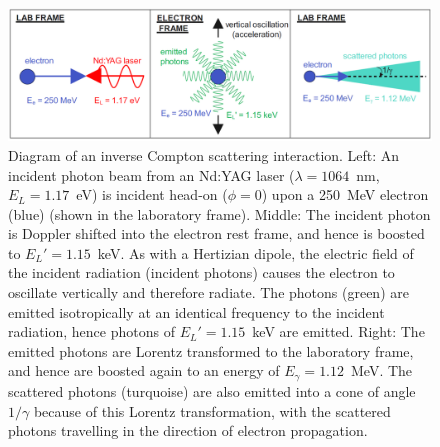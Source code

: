 \documentclass[../main.tex]{subfiles}
\begin{document}
\begin{figure}[!h]
\centering
\includegraphics[width=\textwidth]{Figures/Introduction/ICS_diagram_frames_fixed.pdf}
\caption{Diagram of an inverse Compton scattering interaction. Left: An incident photon beam from an Nd:YAG laser ($\lambda = 1064$~\si{\nano\meter}, $E_{L} = 1.17$~\si{\electronvolt}) is incident head-on ($\phi=0$) upon a 250~\si{\mega\electronvolt} electron (blue) (shown in the laboratory frame). Middle: The incident photon is Doppler shifted into the electron rest frame, and hence is boosted to $E_{L}' = 1.15$~\si{\kilo\electronvolt}. As with a Hertizian dipole, the electric field of the incident radiation (incident photons) causes the electron to oscillate vertically and therefore radiate. The photons (green) are emitted isotropically at an identical frequency to the incident radiation, hence photons of $E_{L}' = 1.15$~\si{\kilo\electronvolt} are emitted. Right: The emitted photons are Lorentz transformed to the laboratory frame, and hence are boosted again to an energy of $E_{\gamma} = 1.12$~\si{\mega\electronvolt}. The scattered photons (turquoise) are also emitted into a cone of angle $1/\gamma$ because of this Lorentz transformation, with the scattered photons travelling in the direction of electron propagation.}
\label{fig:ICS_frames_diagram}
\end{figure}
\end{document}
